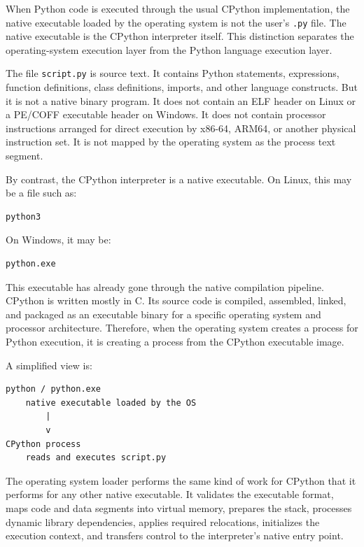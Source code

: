 When Python code is executed through the usual CPython implementation, the native executable loaded by the operating system is not the user's \texttt{.py} file. The native executable is the CPython interpreter itself. This distinction separates the operating-system execution layer from the Python language execution layer.

The file \texttt{script.py} is source text. It contains Python statements, expressions, function definitions, class definitions, imports, and other language constructs. But it is not a native binary program. It does not contain an ELF header on Linux or a PE/COFF executable header on Windows. It does not contain processor instructions arranged for direct execution by x86-64, ARM64, or another physical instruction set. It is not mapped by the operating system as the process text segment.

By contrast, the CPython interpreter is a native executable. On Linux, this may be a file such as:

\begin{verbatim}
python3
\end{verbatim}

On Windows, it may be:

\begin{verbatim}
python.exe
\end{verbatim}

This executable has already gone through the native compilation pipeline. CPython is written mostly in C. Its source code is compiled, assembled, linked, and packaged as an executable binary for a specific operating system and processor architecture. Therefore, when the operating system creates a process for Python execution, it is creating a process from the CPython executable image.

A simplified view is:

\begin{verbatim}
python / python.exe
    native executable loaded by the OS
        |
        v
CPython process
    reads and executes script.py
\end{verbatim}

The operating system loader performs the same kind of work for CPython that it performs for any other native executable. It validates the executable format, maps code and data segments into virtual memory, prepares the stack, processes dynamic library dependencies, applies required relocations, initializes the execution context, and transfers control to the interpreter's native entry point.

